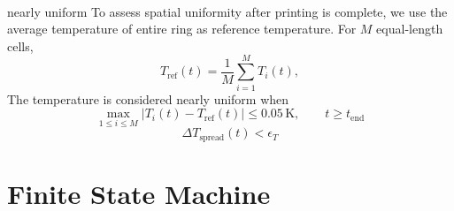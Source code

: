 \documentclass{article}
\begin{document}
\\nearly uniform
To assess spatial uniformity after printing is complete, we use the average temperature of entire ring as reference temperature. For $M$ equal-length cells,
\begin{equation}
    T_\mathrm{ref}(t)=
    \frac{1}{M}\sum_{i=1}^{M} T_i(t),
\end{equation}
The temperature is considered nearly uniform when
\begin{equation}
    \max_{1\le i\le M}
    \left|T_i(t)-T_{\mathrm{ref}}(t)\right|
    \le 0.05\, \mathrm{K},
    \qquad t\ge t_{\mathrm{end}}
\end{equation}
\begin{equation}
    \Delta T_{\mathrm{spread}}(t)<\epsilon_T
\end{equation}



\section{Finite State Machine}
\end{document}
